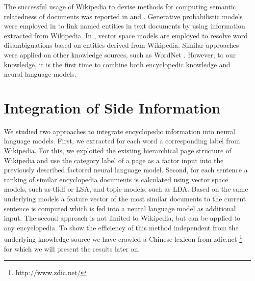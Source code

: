 \documentclass[a4paper]{article}
\begin{document}
The successful usage of Wikipedia to devise methods for computing semantic relatedness of documents was reported in \cite{gabrilovich2007computing} and \cite{strube2006wikirelate}.
Generative probabilistic models were employed in \cite{han2012entity} to link named entities in text documents by using information extracted from Wikipedia. 
In \cite{cucerzan2007large},\cite{bunescu2006using} vector space models are employed to resolve word disambiguations based on entities derived from Wikipedia.
Similar approaches were applied on other knowledge sources, such as WordNet \cite{hearst1992automatic}.
However, to our knowledge, it is the first time to combine both encyclopedic knowledge and neural language models.

\section{Integration of Side Information}
We studied two approaches to integrate encyclopedic information into neural language models.
First, we extracted for each word a corresponding label from Wikipedia. For this, we exploited the existing hierarchical page structure of Wikipedia and use the category label of a page as a factor input into the previously described factored neural language model.
Second, for each sentence a ranking of similar encyclopedia documents is calculated using vector space models, such as tfidf or LSA, and topic models, such as LDA. Based on the same underlying models a feature vector of the most similar documents to the current sentence is computed which is fed into a neural language model as additional input. The second approach is not limited to Wikipedia, but can be applied to any encyclopedia. To show the efficiency of this method independent from the underlying knowledge source we have crawled a Chinese lexicon from zdic.net \footnote{http://www.zdic.net/} for which we will present the results later on. 
\end{document}
